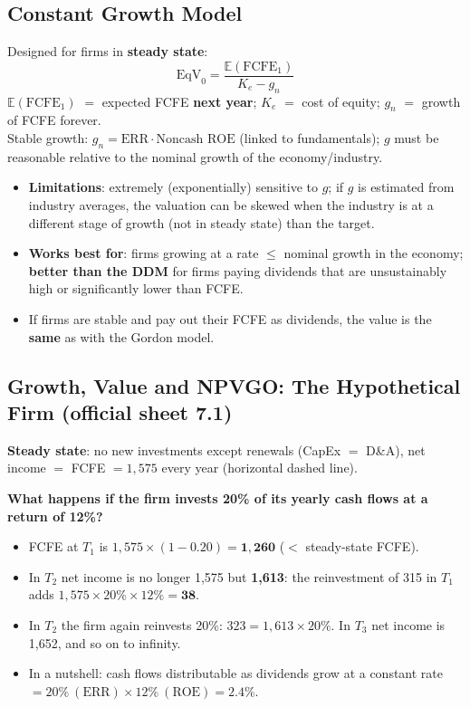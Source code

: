 \subsection{Constant Growth Model}
\begin{keybox}
Designed for firms in \textbf{steady state}:
\[
\text{EqV}_0=\frac{\mathbb{E}(\text{FCFE}_1)}{K_e-g_n}
\]
$\mathbb{E}(\text{FCFE}_1)$ $=$ expected FCFE \textbf{next year}; $K_e$ $=$ cost of equity; $g_n$ $=$ growth of FCFE forever.\\
Stable growth: $g_n=\text{ERR}\cdot\text{Noncash ROE}$ (linked to fundamentals); $g$ must be reasonable relative to the nominal growth of the economy/industry.
\end{keybox}
\begin{itemize}
  \item \textbf{Limitations}: extremely (exponentially) sensitive to $g$; if $g$ is estimated from industry averages, the valuation can be skewed when the industry is at a different stage of growth (not in steady state) than the target.
  \item \textbf{Works best for}: firms growing at a rate $\leq$ nominal growth in the economy; \textbf{better than the DDM} for firms paying dividends that are unsustainably high or significantly lower than FCFE.
  \item If firms are stable and pay out their FCFE as dividends, the value is the \textbf{same} as with the Gordon model.
\end{itemize}

\subsection{Growth, Value and NPVGO: The Hypothetical Firm \textnormal{(official sheet 7.1)}}

\textbf{Steady state}: no new investments except renewals (CapEx $=$ D\&A), net income $=$ FCFE $=1{,}575$ every year (horizontal dashed line).

\textbf{What happens if the firm invests 20\% of its yearly cash flows at a return of 12\%?}
\begin{itemize}
  \item FCFE at $T_1$ is $1{,}575\times(1-0.20)=\mathbf{1{,}260}$ ($<$ steady-state FCFE).
  \item In $T_2$ net income is no longer 1,575 but \textbf{1,613}: the reinvestment of 315 in $T_1$ adds $1{,}575\times20\%\times12\%=\mathbf{38}$.
  \item In $T_2$ the firm again reinvests 20\%: $323=1{,}613\times20\%$. In $T_3$ net income is 1,652, and so on to infinity.
  \item In a nutshell: cash flows distributable as dividends grow at a constant rate $=20\%\ (\text{ERR})\times12\%\ (\text{ROE})=\mathbf{2.4\%}$.
\end{itemize}

